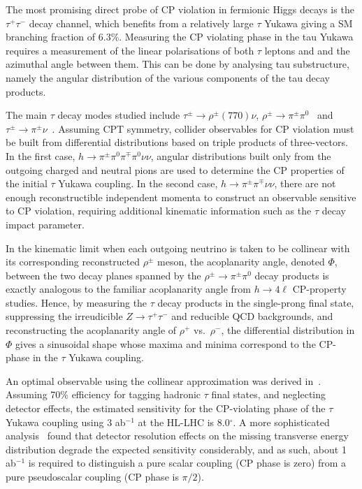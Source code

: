 \documentclass[../report.tex]{subfiles}
\begin{document}

The most promising direct probe of CP violation in fermionic Higgs
decays is the $\tau^+ \tau^-$ decay channel, which benefits from a
relatively large $\tau$ Yukawa giving a SM branching fraction of
$6.3\%$. Measuring the CP violating phase in the tau Yukawa requires a measurement of the linear polarisations of both $\tau$ leptons and and the azimuthal angle between them. This can be done by analysing tau substructure, namely the angular distribution of the various components of the tau decay products.

The main $\tau$ decay modes studied include $\tau^\pm \to
\rho^\pm (770) \nu$, $\rho^\pm \to \pi^\pm \pi^0$~\cite{Bower:2002zx,
  Desch:2003mw, Desch:2003rw, Harnik:2013aja, Askew:2015mda,
  Jozefowicz:2016kvz} and $\tau^\pm \to \pi^\pm
\nu$~\cite{Berge:2008wi, Berge:2008dr, Berge:2011ij}.  Assuming CPT
symmetry, collider observables for CP violation must be built from
differential distributions based on triple products of three-vectors.
In the first case, $h \to \pi^\pm \pi^0 \pi^\mp \pi^0 \nu \nu$,
angular distributions built only from the outgoing charged and neutral
pions are used to determine the CP properties of the initial $\tau$
Yukawa coupling.  In the second case, $h \to \pi^\pm \pi^\mp \nu \nu$,
there are not enough reconstructible independent momenta to construct an observable sensitive to CP violation, requiring additional kinematic information such as the $\tau$ decay impact parameter.

In the kinematic limit when each outgoing neutrino is taken to be
collinear with its corresponding reconstructed $\rho^\pm$ meson, the
acoplanarity angle, denoted $\Phi$, between the two decay planes
spanned by the $\rho^\pm \to \pi^\pm \pi^0$ decay products is exactly
analogous to the familiar acoplanarity angle from $h \to 4 \ell$
CP-property studies.  Hence, by measuring the $\tau$ decay products in
the single-prong final state, suppressing the irreudicible $Z \to
\tau^+ \tau^-$ and reducible QCD backgrounds, and reconstructing the
acoplanarity angle of $\rho^+$ vs.~$\rho^-$, the differential
distribution in $\Phi$ gives a sinusoidal shape whose maxima and
minima correspond to the CP-phase in the $\tau$ Yukawa coupling.  

An optimal observable using the collinear approximation was derived in~\cite{Harnik:2013aja}. Assuming 70\% efficiency for tagging hadronic $\tau$ final states, and
neglecting detector effects, the estimated sensitivity for the
CP-violating phase of the $\tau$ Yukawa coupling using 3 ab$^{-1}$ at
the HL-LHC is 8.0$^\circ$.  A more sophisticated
analysis~\cite{Askew:2015mda} found that detector resolution effects
on the missing transverse energy distribution degrade the expected
sensitivity considerably, and as such, about 1 ab$^{-1}$ is required
to distinguish a pure scalar coupling (CP phase is zero) from a pure
pseudoscalar coupling (CP phase is $\pi/2$).
\end{document}
